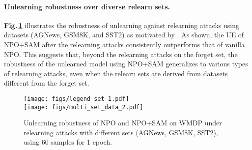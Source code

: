 %
\paragraph{{Unlearning robustness over diverse relearn sets.}} \textbf{Fig.\,\ref{fig: relearn_other_set}} illustrates the robustness of unlearning against relearning attacks using datasets 
(AGNews, GSM8K, and SST2) as motivated by \citep{lucki2024adversarial}. As shown, the UE of NPO+SAM after the relearning attacks consistently outperforms that of vanilla NPO. This suggests that, beyond the 
relearning attacks on the forget set, the robustness of the unlearned model using NPO+SAM generalizes to various types of 
relearning attacks, even when the relearn sets are derived from datasets different from the forget set.

\begin{figure}[htb]
    \centering
    \hspace*{2mm}
    \texttt{[image: figs/legend\_set\_1.pdf]}\\
    \texttt{[image: figs/multi\_set\_data\_2.pdf]}
    \vspace{-2mm}
    \caption{\small{Unlearning robustness of NPO and NPO+SAM on WMDP under relearning attacks with different sets (AGNews, GSM8K, SST2), using 60 samples for 1 epoch.
    }}
    \label{fig: relearn_other_set}
    \vspace{-5mm}
\end{figure}



